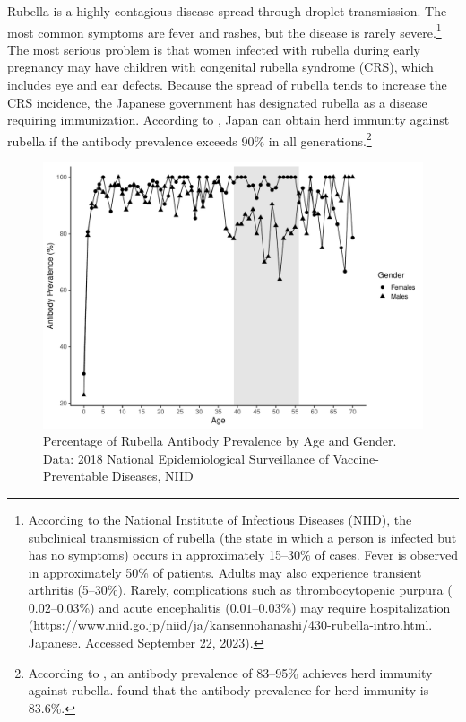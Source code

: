 \documentclass[
      12pt,
    a4paper
]{article}
\begin{document}
Rubella is a highly contagious disease spread through droplet transmission. The most common symptoms are fever and rashes, but the disease is rarely severe.\footnote{According to the National Institute of Infectious Diseases (NIID), the subclinical transmission of rubella (the state in which a person is infected but has no symptoms) occurs in approximately 15--30\% of cases. Fever is observed in approximately 50\% of patients. Adults may also experience transient arthritis (5--30\%). Rarely, complications such as thrombocytopenic purpura (\(0.02\)--\(0.03\)\%) and acute encephalitis (\(0.01\)--\(0.03\)\%) may require hospitalization (\url{https://www.niid.go.jp/niid/ja/kansennohanashi/430-rubella-intro.html}. Japanese. Accessed September 22, 2023).} The most serious problem is that women infected with rubella during early pregnancy may have children with congenital rubella syndrome (CRS), which includes eye and ear defects. Because the spread of rubella tends to increase the CRS incidence, the Japanese government has designated rubella as a disease requiring immunization. According to \citet{Kinoshita2016}, Japan can obtain herd immunity against rubella if the antibody prevalence exceeds 90\% in all generations.\footnote{According to \citet{Plans-Rubio2012}, an antibody prevalence of 83--95\% achieves herd immunity against rubella. \citet{Nishiura2015} found that the antibody prevalence for herd immunity is 83.6\%.}

\begin{figure}[t]
\includegraphics{Main-Document-LaTeX_files/figure-latex/antibody-1} \caption{Percentage of Rubella Antibody Prevalence by Age and Gender. Data: 2018 National Epidemiological Surveillance of Vaccine-Preventable Diseases, NIID}\label{fig:antibody}
\end{figure}
\end{document}
